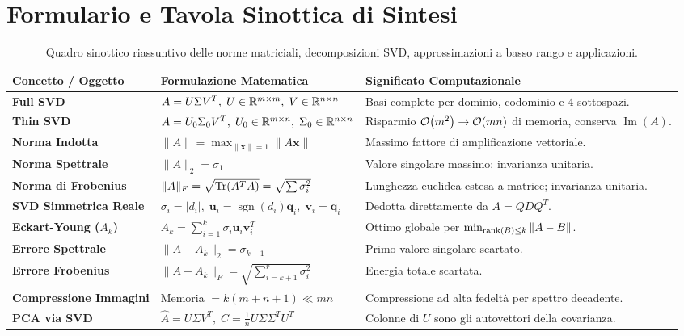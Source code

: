 \FloatBarrier
\section{Formulario e Tavola Sinottica di Sintesi}
\label{sec:formulario-svd-norme}

\begin{table}[H]
\centering
\small
\renewcommand{\arraystretch}{1.3}
\begin{tabularx}{\textwidth}{p{4.2cm} p{4.6cm} X}
\toprule
\textbf{Concetto / Oggetto} & \textbf{Formulazione Matematica} & \textbf{Significato Computazionale} \\
\midrule
\textbf{Full SVD} & $A = U \Sigma V^T, \; U \in \mathbb{R}^{m \times m}, \; V \in \mathbb{R}^{n \times n}$ & Basi complete per dominio, codominio e 4 sottospazi. \\
\textbf{Thin SVD} & $A = U_0 \Sigma_0 V^T, \; U_0 \in \mathbb{R}^{m \times n}, \; \Sigma_0 \in \mathbb{R}^{n \times n}$ & Risparmio $\mathcal{O}\!\left(m^2\right) \to \mathcal{O}\!\left(mn\right)$ di memoria, conserva $\operatorname{Im}(A)$. \\
\textbf{Norma Indotta} & $\|A\| = \max_{\|\mathbf{x}\|=1} \|A\mathbf{x}\|$ & Massimo fattore di amplificazione vettoriale. \\
\textbf{Norma Spettrale} & $\|A\|_2 = \sigma_1$ & Valore singolare massimo; invarianza unitaria. \\
\textbf{Norma di Frobenius} & $\|A\|_F = \sqrt{\operatorname{Tr}(A^T A)} = \sqrt{\sum \sigma_i^2}$ & Lunghezza euclidea estesa a matrice; invarianza unitaria. \\
\textbf{SVD Simmetrica Reale} & $\sigma_i = |d_i|, \; \mathbf{u}_i = \operatorname{sgn}(d_i)\mathbf{q}_i, \; \mathbf{v}_i = \mathbf{q}_i$ & Dedotta direttamente da $A = Q D Q^T$. \\
\textbf{Eckart-Young ($A_k$)} & $A_k = \sum_{i=1}^k \sigma_i \mathbf{u}_i \mathbf{v}_i^T$ & Ottimo globale per $\min_{\operatorname{rank}(B)\le k} \|A-B\|$. \\
\textbf{Errore Spettrale} & $\|A - A_k\|_2 = \sigma_{k+1}$ & Primo valore singolare scartato. \\
\textbf{Errore Frobenius} & $\|A - A_k\|_F = \sqrt{\sum_{i=k+1}^r \sigma_i^2}$ & Energia totale scartata. \\
\textbf{Compressione Immagini} & Memoria $= k(m + n + 1) \ll mn$ & Compressione ad alta fedelt\`a per spettro decadente. \\
\textbf{PCA via SVD} & $\widehat{A} = U \Sigma V^T, \; C = \frac{1}{n} U \Sigma \Sigma^T U^T$ & Colonne di $U$ sono gli autovettori della covarianza. \\
\bottomrule
\end{tabularx}
\caption{Quadro sinottico riassuntivo delle norme matriciali, decomposizioni SVD, approssimazioni a basso rango e applicazioni.}
\label{tab:formulario-svd-norme-applicazioni}
\end{table}
